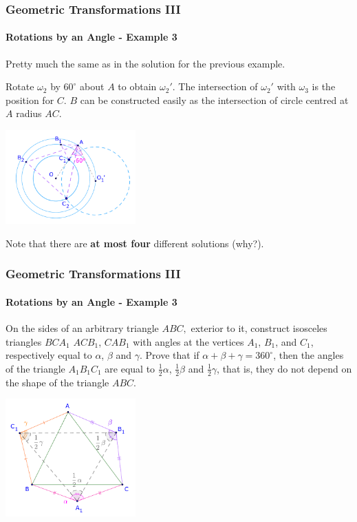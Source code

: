 \documentclass[8pt,xcolor=table,dvipsnames]{beamer}
\providecommand{\half}{\frac{1}{2}}
\newcommand{\dg}{^\circ}
\begin{document}
\begin{frame}[t]
    \frametitle{Geometric Transformations III}
    \framesubtitle{Rotations by an Angle - Example 3}
    Pretty much the same as in the solution for the previous example.
    
    \bigbreak
    Rotate $\omega_2$ by $60\dg$ about $A$ to obtain $\omega_2'$.
    The intersection of $\omega_2'$ with $\omega_3$ is the position for $C.$
    $B$ can be constructed easily as the intersection of circle centred at $A$ radius $AC.$
    \begin{center}
        \includegraphics[width=5cm]{./svg/pdf/rotation-5b.pdf}
    \end{center}

    \bigbreak
    Note that there are \textbf{at most four} different solutions (why?).
\end{frame}

\begin{frame}[t]
    \frametitle{Geometric Transformations III}
    \framesubtitle{Rotations by an Angle - Example 3}
    \begin{example}
        On the sides of an arbitrary triangle $ABC,$ exterior to it, construct isosceles triangles $BCA_1$ $ACB_1$, $CAB_1$
        with angles at the vertices $A_1$, $B_1$, and $C_1$, respectively equal to $\alpha$, $\beta$ and $\gamma$.
        \bigbreak
        Prove that if $\alpha + \beta + \gamma = 360\dg$, then the angles of the triangle $A_1B_1C_1$
        are equal to $\half\alpha$, $\half\beta$ and $\half\gamma$, that is, they do not depend on the shape of the triangle $ABC.$
    \end{example}

    \begin{center}
        \includegraphics[width=5cm]{./svg/pdf/rotation-6a.pdf}
    \end{center}
\end{frame}
\end{document}
